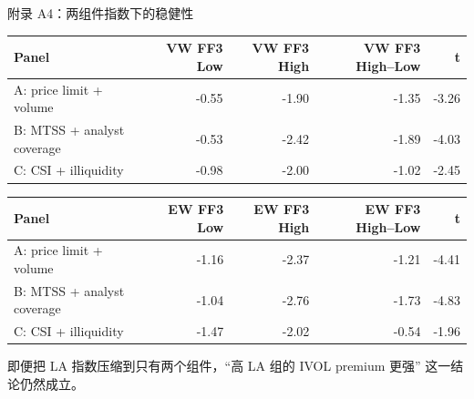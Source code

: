 \documentclass[aspectratio=169,10pt]{beamer}
\newcommand{\tinytab}{\tiny\setlength{\tabcolsep}{2.2pt}\renewcommand{\arraystretch}{1.08}}
\begin{document}
\begin{frame}{附录 A4：两组件指数下的稳健性}
	\tinytab
	\begin{tabular}{lrrrr}
		\toprule
		Panel & VW FF3 Low & VW FF3 High & VW FF3 High--Low & t\\
		\midrule
		A: price limit + volume & -0.55 & -1.90 & -1.35 & -3.26\\
		B: MTSS + analyst coverage & -0.53 & -2.42 & -1.89 & -4.03\\
		C: CSI + illiquidity & -0.98 & -2.00 & -1.02 & -2.45\\
		\bottomrule
	\end{tabular}
	\vspace{6pt}
	\tinytab
	\begin{tabular}{lrrrr}
		\toprule
		Panel & EW FF3 Low & EW FF3 High & EW FF3 High--Low & t\\
		\midrule
		A: price limit + volume & -1.16 & -2.37 & -1.21 & -4.41\\
		B: MTSS + analyst coverage & -1.04 & -2.76 & -1.73 & -4.83\\
		C: CSI + illiquidity & -1.47 & -2.02 & -0.54 & -1.96\\
		\bottomrule
	\end{tabular}
	\par\vspace{5pt}
	\small 即便把 LA 指数压缩到只有两个组件，``高 LA 组的 IVOL premium 更强'' 这一结论仍然成立。
\end{frame}
\end{document}
